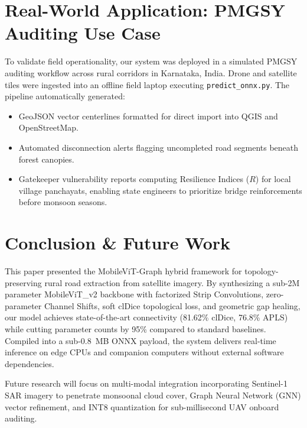 \documentclass[conference]{IEEEtran}
\begin{document}
\section{Real-World Application: PMGSY Auditing Use Case}
\label{sec:application}
To validate field operationality, our system was deployed in a simulated PMGSY auditing workflow across rural corridors in Karnataka, India. Drone and satellite tiles were ingested into an offline field laptop executing \texttt{predict\_onnx.py}. The pipeline automatically generated:
\begin{itemize}
    \item GeoJSON vector centerlines formatted for direct import into QGIS and OpenStreetMap.
    \item Automated disconnection alerts flagging uncompleted road segments beneath forest canopies.
    \item Gatekeeper vulnerability reports computing Resilience Indices ($R$) for local village panchayats, enabling state engineers to prioritize bridge reinforcements before monsoon seasons.
\end{itemize}

\section{Conclusion \& Future Work}
\label{sec:conclusion}
This paper presented the MobileViT-Graph hybrid framework for topology-preserving rural road extraction from satellite imagery. By synthesizing a sub-2M parameter MobileViT\_v2 backbone with factorized Strip Convolutions, zero-parameter Channel Shifts, soft clDice topological loss, and geometric gap healing, our model achieves state-of-the-art connectivity (81.62\% clDice, 76.8\% APLS) while cutting parameter counts by 95\% compared to standard baselines. Compiled into a sub-0.8~MB ONNX payload, the system delivers real-time inference on edge CPUs and companion computers without external software dependencies.

Future research will focus on multi-modal integration incorporating Sentinel-1 SAR imagery to penetrate monsoonal cloud cover, Graph Neural Network (GNN) vector refinement, and INT8 quantization for sub-millisecond UAV onboard auditing.
\end{document}
